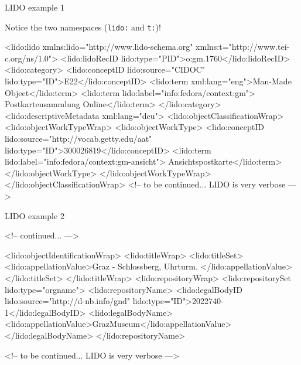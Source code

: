 \begin{frame}[fragile]{LIDO example 1}

{\scriptsize Notice the two namespaces (\texttt{lido:} and \texttt{t:})! }
    
\begin{xmlcode}
<lido:lido 
  xmlns:lido="http://www.lido-schema.org" 
  xmlns:t="http://www.tei-c.org/ns/1.0">
  <lido:lidoRecID lido:type="PID">o:gm.1760</lido:lidoRecID>
  <lido:category>
    <lido:conceptID lido:source="CIDOC" 
                    lido:type="ID">E22</lido:conceptID>
    <lido:term xml:lang="eng">Man-Made Object</lido:term>
    <lido:term lido:label="info:fedora/context:gm">
      Postkartensammlung Online</lido:term>
  </lido:category>
  <lido:descriptiveMetadata xml:lang="deu">
    <lido:objectClassificationWrap>
      <lido:objectWorkTypeWrap>
        <lido:objectWorkType>
          <lido:conceptID lido:source="http://vocab.getty.edu/aat"
            lido:type="ID">300026819</lido:conceptID>
          <lido:term lido:label="info:fedora/context:gm-ansicht">
            Ansichtspostkarte</lido:term>
        </lido:objectWorkType>
      </lido:objectWorkTypeWrap>
    </lido:objectClassificationWrap>
    <!-- to be continued... LIDO is very verbose --->
\end{xmlcode}

\end{frame}


\begin{frame}[fragile]{LIDO example 2}

\begin{xmlcode}
<!-- continued... --->

    <lido:objectIdentificationWrap>
      <lido:titleWrap>
        <lido:titleSet>
          <lido:appellationValue>Graz - Schlossberg, Uhrturm.
             </lido:appellationValue>
        </lido:titleSet>
      </lido:titleWrap>
      <lido:repositoryWrap>
        <lido:repositorySet lido:type="orgname">
          <lido:repositoryName>
            <lido:legalBodyID lido:source="http://d-nb.info/gnd"
              lido:type="ID">2022740-1</lido:legalBodyID>
            <lido:legalBodyName>
              <lido:appellationValue>GrazMuseum</lido:appellationValue>
            </lido:legalBodyName>
          </lido:repositoryName>
          
    <!-- to be continued... LIDO is very verbose --->
\end{xmlcode}

\end{frame}



